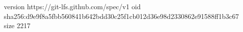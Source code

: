 version https://git-lfs.github.com/spec/v1
oid sha256:d9e9f8a5fbb560841b642bdd30c25f1cb012d36e98d2330862e91588ff1b3c67
size 2217
